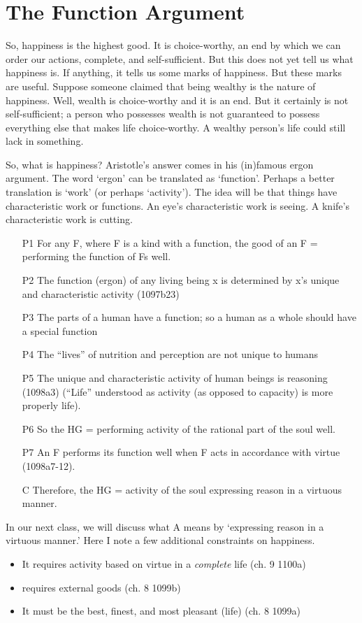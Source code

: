 \documentclass[oneside]{article}
\begin{document}
\section*{The Function Argument}

So, happiness is the highest good. It is choice-worthy, an end by which we can order our actions, complete, and self-sufficient. But this does not yet tell us what happiness is. If anything, it tells us some marks of happiness. But these marks are useful. Suppose someone claimed that being wealthy is the nature of happiness. Well, wealth is choice-worthy and it is an end. But it certainly is not self-sufficient; a person who possesses wealth is not guaranteed to possess everything else that makes life choice-worthy. A wealthy person's life could still lack in something. 

So, what is happiness? Aristotle's answer comes in his (in)famous ergon argument. The word `ergon' can be translated as `function'. Perhaps a better translation is `work' (or perhaps `activity'). The idea will be that things have characteristic work or functions. An eye's characteristic work is seeing. A knife's characteristic work is cutting.

\begin{enumerate}
\item[P1] For any F, where F is a kind with a function, the good of an F = performing the function of Fs well.
\item[P2] The function (ergon) of any living being x is determined by x's unique and  characteristic activity (1097b23)
\item[P3] The parts of a human have a function; so a human as a whole should have a special function
\item[P4] The ``lives'' of nutrition and perception are not unique to humans
\item[P5] The unique and characteristic activity of human beings is reasoning (1098a3) (``Life'' understood as activity (as opposed to capacity) is more properly life).
\item[P6] So the HG = performing activity of the rational part of the soul well.
\item[P7] An F performs its function well when F acts in accordance with virtue (1098a7-12).
\item[C] Therefore, the HG = activity of the soul expressing reason in a virtuous manner.  
\end{enumerate}
In our next class, we will discuss what A means by `expressing reason in a virtuous manner.' Here I note a few additional constraints on happiness.\begin{itemize}
\item It requires activity based on virtue in a \emph{complete} life (ch. 9 1100a)
\item requires external goods (ch. 8 1099b)
\item It must be the best, finest, and most pleasant (life) (ch. 8 1099a)
\end{itemize}
\end{document}
